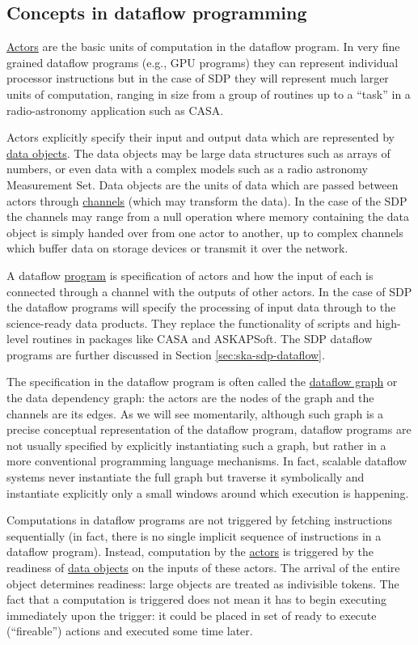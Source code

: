 \documentclass[11pt,a4paper]{article}
\begin{document}
\subsection{Concepts in dataflow programming}

\underline{Actors} are the basic units of computation in the dataflow
program. In very fine grained dataflow programs (e.g., GPU programs)
they can represent individual processor instructions but in the case
of SDP they will represent much larger units of computation, ranging
in size from a group of routines up to a ``task'' in a radio-astronomy
application such as CASA.  

Actors explicitly specify their input and output data which are
represented by \underline{data objects}. The data objects may be large
data structures such as arrays of numbers, or even data with a complex
models such as a radio astronomy Measurement Set. Data objects are the
units of data which are passed between actors through
\underline{channels} (which may transform the data). In the case of
the SDP the channels may range from a null operation where memory
containing the data object is simply handed over from one actor to
another, up to complex channels which buffer data on storage devices
or transmit it over the network.

A dataflow \underline{program} is specification of actors and how the
input of each is connected through a channel with the outputs of other
actors. In the case of SDP the dataflow programs will specify the
processing of input data through to the science-ready data
products. They replace the functionality of scripts and high-level
routines in packages like CASA and ASKAPSoft. The SDP dataflow
programs are further discussed in Section \ref{sec:ska-sdp-dataflow}.

The specification in the dataflow program is often called the
\underline{dataflow graph} or the data dependency graph: the actors
are the nodes of the graph and the channels are its edges. As we will
see momentarily, although such graph is a precise conceptual
representation of the dataflow program, dataflow programs are not
usually specified by explicitly instantiating such a graph, but rather
in a more conventional programming language mechanisms. In fact,
scalable dataflow
\citep{Bosilca6008964,Wozniak:2012:TDD:2443416.2443421} systems never
instantiate the full graph but traverse it symbolically and
instantiate explicitly only a small windows around which execution is
happening.

Computations in dataflow programs are not triggered by fetching
instructions sequentially (in fact, there is no single implicit
sequence of instructions in a dataflow program). Instead, computation
by the \underline{actors} is triggered by the readiness of
\underline{data objects} on the inputs of these actors. The arrival of
the entire object determines readiness: large objects are treated as
indivisible tokens.  The fact that a computation is triggered does not
mean it has to begin executing immediately upon the trigger: it could
be placed in set of ready to execute (“fireable”) actions and executed
some time later.
\end{document}
